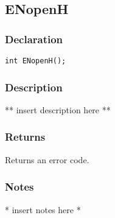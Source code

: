 \subsection{ENopenH}
\subsubsection{Declaration}
\begin{lstlisting}
int ENopenH();
\end{lstlisting}
\subsubsection{Description}
** insert description here **
\subsubsection{Returns}
Returns an error code.
\subsubsection{Notes}
* insert notes here *